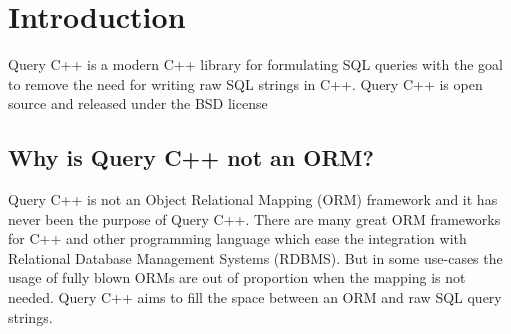 \section{\label{sec:intro}Introduction}

Query C++ is a modern C++ library for formulating SQL queries with the goal to remove the need for writing raw SQL strings in C++.
Query C++ is open source and released under the BSD license


\subsection{Why is Query C++ not an ORM?}

Query C++ is not an Object Relational Mapping (ORM) framework and it has never been the purpose of Query C++.
There are many great ORM frameworks for C++ and other programming language which ease the integration with Relational Database Management Systems (RDBMS).
But in some use-cases the usage of fully blown ORMs are out of proportion when the mapping is not needed.
Query C++ aims to fill the space between an ORM and raw SQL query strings. 